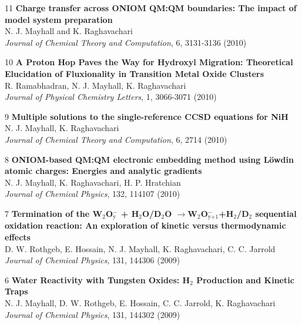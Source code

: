 \documentclass[10pt]{article}
\newenvironment{lonelist}[1][\enskip\textbullet]%
        {\vspace{-\baselineskip}\begin{list}{#1}{%
        \setlength{\partopsep}{0pt}%
        \setlength{\topsep}{0pt}}}
        {\end{list}\vspace{-.6\baselineskip}}
\begin{document}
\begin{lonelist}
\item[11\hspace{4pt}] \textbf{Charge transfer across ONIOM QM:QM boundaries: The impact of model system preparation}\\
N. J. Mayhall and K. Raghavachari\\
 \textsl{Journal of Chemical Theory and Computation}, 6, 3131-3136 (2010)

\item[10\hspace{4pt}] \textbf{A Proton Hop Paves the Way for Hydroxyl Migration: Theoretical Elucidation of Fluxionality in Transition Metal Oxide Clusters}\\
R. Ramabhadran, N. J. Mayhall, K. Raghavachari\\
\textsl{Journal of Physical Chemistry Letters}, 1, 3066-3071 (2010)

\item[9\hspace{4pt}] \textbf{Multiple solutions to the single-reference CCSD equations for NiH}\\
N. J. Mayhall, K. Raghavachari\\
\textsl{Journal of Chemical Theory and Computation}, 6, 2714 (2010)

\item[8\hspace{4pt}] \textbf{ONIOM-based QM:QM electronic embedding method using L\"owdin atomic charges: Energies and analytic gradients}\\
N. J. Mayhall, K. Raghavachari, H. P. Hratchian\\
\textsl{Journal of Chemical Physics}, 132, 114107 (2010)

\item[7\hspace{4pt}] \textbf{Termination of the W$_2$O$_\text{y}^-$ + H$_2$O/D$_2$O $\rightarrow$W$_2$O$_{\text{y+1}}^-$+H$_2$/D$_2$ sequential oxidation reaction: An exploration of kinetic versus thermodynamic effects}\\
D. W. Rothgeb, E. Hossain, N. J. Mayhall, K. Raghavachari, C. C. Jarrold\\
\textsl{Journal of Chemical Physics}, 131, 144306 (2009)


\item[6\hspace{4pt}] \textbf{Water Reactivity with Tungsten Oxides: H$_2$ Production and Kinetic Traps}\\
N. J. Mayhall, D. W. Rothgeb, E. Hossain, C. C. Jarrold, K. Raghavachari\\
\textsl{Journal of Chemical Physics}, 131, 144302 (2009)



\end{lonelist}
\end{document}
